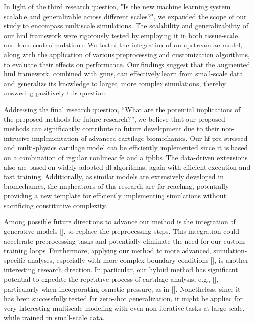 \documentclass[12pt,a4paper]{report}
\begin{document}
In light of the third research question, "Is the new machine learning system scalable and generalizable across different scales?", we expanded the scope of our study to encompass multiscale simulations. The scalability and generalizability of our \ac{hml} framework were rigorously tested by employing it in both tissue-scale and knee-scale simulations. We tested the integration of an upstream \ac{ae} model, along with the application of various preprocessing and customization algorithms, to evaluate their effects on performance. Our findings suggest that the augmented \ac{hml} framework, combined with \acp{gnn}, can effectively learn from small-scale data and generalize its knowledge to larger, more complex simulations, thereby answering positively this question.

Addressing the final research question, ``What are the potential implications of the proposed methods for future research?'', we believe that our proposed methods can significantly contribute to future development due to their non-intrusive implementation of advanced cartilage biomechanics. Our \ac{hf} pre-stressed and multi-physics cartilage model can be efficiently implemented since it is based on a combination of regular nonlinear \ac{fe} and a \ac{fpbbs}. The data-driven extensions also are based on widely adopted \ac{dl} algorithms, again with efficient execution and fast training. Additionally, as similar models are extensively developed in biomechanics, the implications of this research are far-reaching, potentially providing a new template for efficiently implementing simulations without sacrificing constitutive complexity.

Among possible future directions to advance our method is the integration of generative models [\cite{rezende2014,kingma2014}], to replace the preprocessing steps. This integration could accelerate preprocessing tasks and potentially eliminate the need for our custom training loops. Furthermore, applying our method to more advanced, simulation-specific analyses, especially with more complex boundary conditions [\cite{lenhart2015}], is another interesting research direction. In particular, our hybrid method has significant potential to expedite the repetitive process of cartilage analysis, e.g., [\cite{elahi2021}], particularly when incorporating osmotic pressure, as in [\cite{elahi2023}]. Nonetheless, since it has been successfully tested for zero-shot generalization, it might be applied for very interesting multiscale modeling with even non-iterative tasks at large-scale, while trained on small-scale data.
\end{document}

